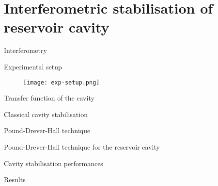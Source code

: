 \section{Interferometric stabilisation of reservoir cavity}

\begin{frame}{Interferometry}
	
\end{frame}

\begin{frame}{Experimental setup}
	\begin{figure}
		\centering
		\texttt{[image: exp-setup.png]}
	\end{figure}
\end{frame}

\begin{frame}{Transfer function of the cavity}
	
\end{frame}

\begin{frame}{Classical cavity stabilisation}
	
\end{frame}

\begin{frame}{Pound-Drever-Hall technique}
	
\end{frame}

\begin{frame}{Pound-Drever-Hall technique for the reservoir cavity}

\end{frame}

\begin{frame}{Cavity stabilisation performances}
	
\end{frame}

\begin{frame}{Results}
	
\end{frame}
